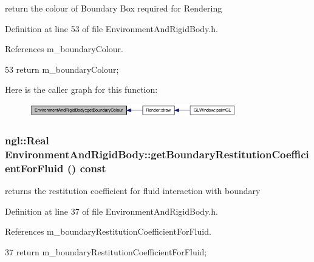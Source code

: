 return the colour of Boundary Box required for Rendering 



Definition at line 53 of file EnvironmentAndRigidBody.h.



References m\_\-boundaryColour.




\begin{DoxyCode}
53 {return m_boundaryColour;}
\end{DoxyCode}




Here is the caller graph for this function:\nopagebreak
\begin{figure}[H]
\begin{center}
\leavevmode
\includegraphics[width=256pt]{class_environment_and_rigid_body_a8ca2c863d79b81cc83b2be0529de0a96_icgraph}
\end{center}
\end{figure}


\hypertarget{class_environment_and_rigid_body_ad1877fcc8892fd5ddf67169fe81e9c48}{
\subsubsection[{getBoundaryRestitutionCoefficientForFluid}]{\setlength{\rightskip}{0pt plus 5cm}ngl::Real EnvironmentAndRigidBody::getBoundaryRestitutionCoefficientForFluid () const}}
\label{class_environment_and_rigid_body_ad1877fcc8892fd5ddf67169fe81e9c48}


returns the restitution coefficient for fluid interaction with boundary 



Definition at line 37 of file EnvironmentAndRigidBody.h.



References m\_\-boundaryRestitutionCoefficientForFluid.




\begin{DoxyCode}
37 { return m_boundaryRestitutionCoefficientForFluid; }
\end{DoxyCode}


